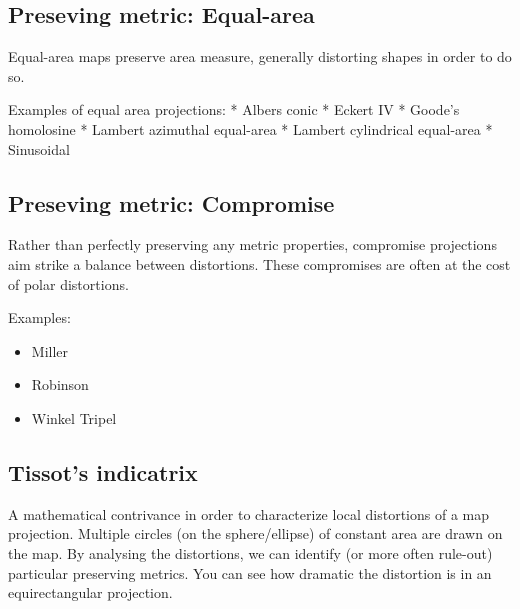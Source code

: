\documentclass[11pt]{article}
\providecommand{\tightlist}{%
      \setlength{\itemsep}{0pt}\setlength{\parskip}{0pt}}
\begin{document}
    \hypertarget{preseving-metric-equal-area}{%
\subsection{Preseving metric:
Equal-area}\label{preseving-metric-equal-area}}

Equal-area maps preserve area measure, generally distorting shapes in
order to do so.

Examples of equal area projections: * Albers conic * Eckert IV * Goode's
homolosine * Lambert azimuthal equal-area * Lambert cylindrical
equal-area * Sinusoidal

    \hypertarget{preseving-metric-compromise}{%
\subsection{Preseving metric:
Compromise}\label{preseving-metric-compromise}}

Rather than perfectly preserving any metric properties, compromise
projections aim strike a balance between distortions. These compromises
are often at the cost of polar distortions.

Examples:

\begin{itemize}
\tightlist
\item
  Miller
\item
  Robinson
\item
  Winkel Tripel
\end{itemize}

    \hypertarget{tissots-indicatrix}{%
\subsection{Tissot's indicatrix}\label{tissots-indicatrix}}

A mathematical contrivance in order to characterize local distortions of
a map projection. Multiple circles (on the sphere/ellipse) of constant
area are drawn on the map. By analysing the distortions, we can identify
(or more often rule-out) particular preserving metrics. You can see how
dramatic the distortion is in an equirectangular projection.


    
    
    
    
\end{document}
